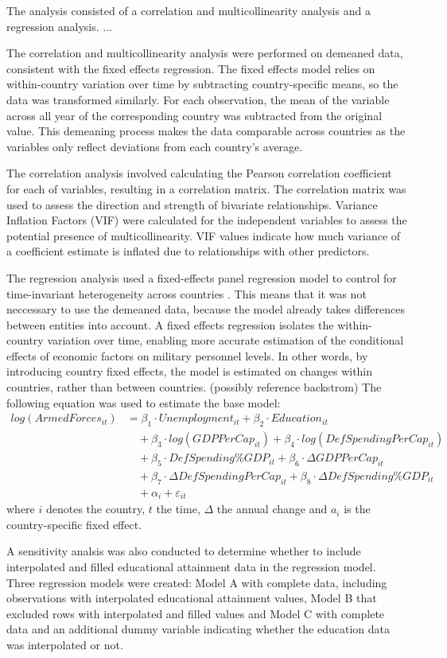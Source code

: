 The analysis consisted of a correlation and multicollinearity analysis and a regression analysis. ...

The correlation and multicollinearity analysis were performed on demeaned data, consistent 
with the fixed effects regression. The fixed effects model relies on within-country variation 
over time by subtracting country-specific means, so the data was transformed similarly. For 
each observation, the mean of the variable across all year of the corresponding country was 
subtracted from the original value. This demeaning process makes the data comparable across 
countries as the variables only reflect deviations from each country's average. 

The correlation analysis involved calculating the Pearson correlation coefficient for each 
of variables, resulting in a correlation matrix. The correlation matrix was used to assess the 
direction and strength of bivariate relationships.
Variance Inflation Factors (VIF) were calculated for the independent variables to 
assess the potential presence of multicollinearity. VIF values indicate how much variance
of a coefficient estimate is inflated due to relationships with other predictors.

The regression analysis used a fixed-effects panel regression model to control for time-invariant 
heterogeneity across countries \parencite{backstrom_are_2019}. This means that it was not 
neccessary to 
use the demeaned data, because the model already takes differences between entities into account.
A fixed effects regression isolates the within-country variation over time, enabling more accurate 
estimation of the conditional effects of economic factors on military personnel levels.
In other words, by introducing country fixed effects, the model is estimated on changes within 
countries, rather than between countries. (possibly reference backstrom) 
The following equation was used to estimate the base model:
\begin{align*}
log(ArmedForces_{it}) &= \beta_1 \cdot Unemployment_{it} 
+ \beta_2 \cdot Education_{it} \\
&\quad + \beta_3 \cdot log(GDPPerCap_{it}) 
+ \beta_4 \cdot log(DefSpendingPerCap_{it}) \\
&\quad + \beta_5 \cdot DefSpending\%GDP_{it} 
+ \beta_6 \cdot \Delta GDPPerCap_{it} \\
&\quad + \beta_7 \cdot \Delta DefSpendingPerCap_{it} 
+ \beta_8 \cdot \Delta DefSpending\%GDP_{it} \\
&\quad + \alpha_i + \varepsilon_{it}
\end{align*}
where $i$ denotes the country, $t$ the time, $\Delta$ the annual change and 
$a_i$ is the country-specific fixed effect.

A sensitivity analsis was also conducted to determine whether to include interpolated and filled educational 
attainment data in the regression model. Three regression models were created: Model A with 
complete data, including observations with interpolated educational attainment values, Model B 
that excluded rows with interpolated and filled values and Model C with complete data and an additional 
dummy variable indicating whether the education data was interpolated or not.